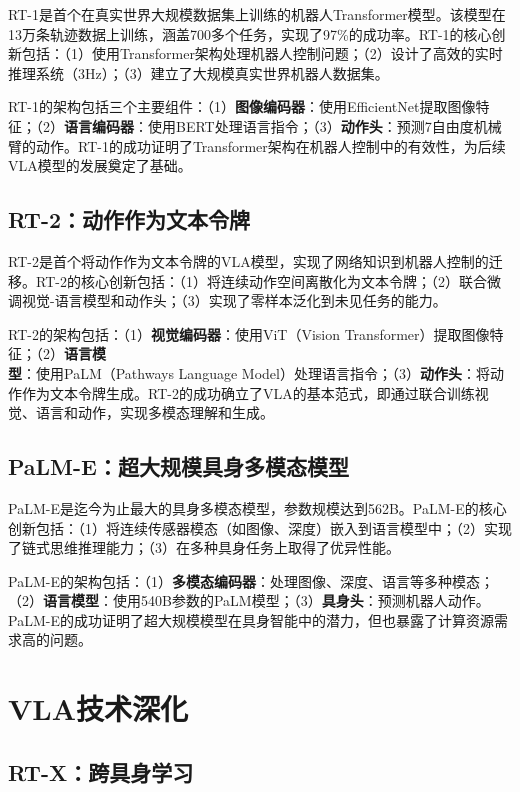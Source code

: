\documentclass[12pt,a4paper]{article}
\begin{document}
RT-1\cite{rt1}是首个在真实世界大规模数据集上训练的机器人Transformer模型。该模型在13万条轨迹数据上训练，涵盖700多个任务，实现了97\%的成功率。RT-1的核心创新包括：（1）使用Transformer架构处理机器人控制问题；（2）设计了高效的实时推理系统（3Hz）；（3）建立了大规模真实世界机器人数据集。

RT-1的架构包括三个主要组件：（1）\textbf{图像编码器}：使用EfficientNet提取图像特征；（2）\textbf{语言编码器}：使用BERT处理语言指令；（3）\textbf{动作头}：预测7自由度机械臂的动作。RT-1的成功证明了Transformer架构在机器人控制中的有效性，为后续VLA模型的发展奠定了基础。

\subsection{RT-2：动作作为文本令牌}

RT-2\cite{rt2}是首个将动作作为文本令牌的VLA模型，实现了网络知识到机器人控制的迁移。RT-2的核心创新包括：（1）将连续动作空间离散化为文本令牌；（2）联合微调视觉-语言模型和动作头；（3）实现了零样本泛化到未见任务的能力。

RT-2的架构包括：（1）\textbf{视觉编码器}：使用ViT（Vision Transformer）提取图像特征；（2）\textbf{语言模型}：使用PaLM（Pathways Language Model）处理语言指令；（3）\textbf{动作头}：将动作作为文本令牌生成。RT-2的成功确立了VLA的基本范式，即通过联合训练视觉、语言和动作，实现多模态理解和生成。

\subsection{PaLM-E：超大规模具身多模态模型}

PaLM-E\cite{palme}是迄今为止最大的具身多模态模型，参数规模达到562B。PaLM-E的核心创新包括：（1）将连续传感器模态（如图像、深度）嵌入到语言模型中；（2）实现了链式思维推理能力；（3）在多种具身任务上取得了优异性能。

PaLM-E的架构包括：（1）\textbf{多模态编码器}：处理图像、深度、语言等多种模态；（2）\textbf{语言模型}：使用540B参数的PaLM模型；（3）\textbf{具身头}：预测机器人动作。PaLM-E的成功证明了超大规模模型在具身智能中的潜力，但也暴露了计算资源需求高的问题。

\section{VLA技术深化}

\subsection{RT-X：跨具身学习}
\end{document}
